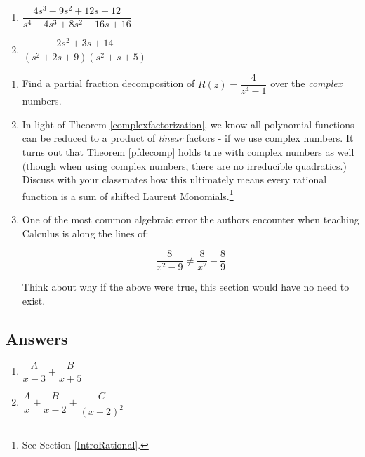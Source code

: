 \documentclass{ximera}
\begin{document}
\begin{multicols}{2}
\begin{enumerate}
\setcounter{enumi}{\value{HW}}

\item $\dfrac{4s^{3} - 9s^{2} + 12s + 12}{s^{4} - 4s^{3} + 8s^{2} - 16s + 16}$
\item $\dfrac{2s^{2} + 3s + 14}{(s^{2} + 2s + 9)(s^{2} + s + 5)}$ \label{findparfraclast}

\setcounter{HW}{\value{enumi}}
\end{enumerate}
\end{multicols}

\begin{enumerate}
\setcounter{enumi}{\value{HW}}

\item  Find a partial fraction decomposition of $R(z) = \dfrac{4}{z^4-1}$ over the \textit{complex} numbers.  

\item  In light of Theorem \ref{complexfactorization}, we know all polynomial functions can be reduced to a product of \textit{linear} factors - if we use complex numbers.  It turns out that Theorem \ref{pfdecomp} holds true with complex numbers as well (though when using complex numbers, there are no irreducible quadratics.)  Discuss with your classmates how this ultimately means every rational function is a sum of shifted Laurent Monomials.\footnote{See Section \ref{IntroRational}.}

\item  One of the most common algebraic error the authors encounter when teaching  Calculus is along the lines of:

\[ \dfrac{8}{x^2 - 9} \neq \dfrac{8}{x^2} - \dfrac{8}{9}\]

Think about  why if the above were true, this section would have no need to exist.

\end{enumerate}

\newpage

\subsection{Answers}

\begin{multicols}{2}
\begin{enumerate}

\item $\dfrac{A}{x - 3} + \dfrac{B}{x + 5}$
\item $\dfrac{A}{x} + \dfrac{B}{x - 2} + \dfrac{C}{(x - 2)^{2}}$

\setcounter{HW}{\value{enumi}}
\end{enumerate}
\end{multicols}
\end{document}
